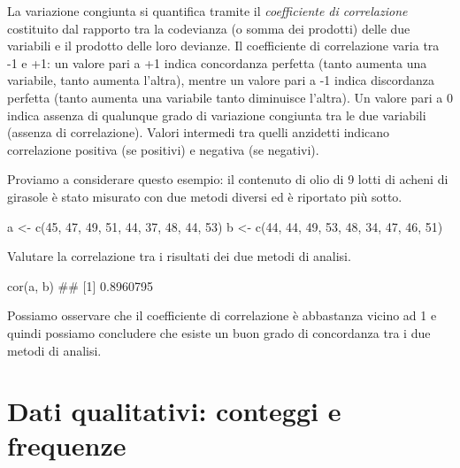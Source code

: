 \documentclass[a4paper,12pt,oneside]{book}
\newenvironment{Shaded}{}{}
\newcommand{\KeywordTok}[1]{#1}
\newcommand{\DecValTok}[1]{#1}
\newcommand{\StringTok}[1]{#1}
\newcommand{\CommentTok}[1]{#1}
\newcommand{\NormalTok}[1]{#1}
\begin{document}
La variazione congiunta si quantifica tramite il \emph{coefficiente di correlazione} costituito dal rapporto tra la codevianza (o somma dei prodotti) delle due variabili e il prodotto delle loro devianze. Il coefficiente di correlazione varia tra -1 e +1: un valore pari a +1 indica concordanza perfetta (tanto aumenta una variabile, tanto aumenta l'altra), mentre un valore pari a -1 indica discordanza perfetta (tanto aumenta una variabile tanto diminuisce l'altra). Un valore pari a 0 indica assenza di qualunque grado di variazione congiunta tra le due variabili (assenza di correlazione). Valori intermedi tra quelli anzidetti indicano correlazione positiva (se positivi) e negativa (se negativi).

Proviamo a considerare questo esempio: il contenuto di olio di 9 lotti di acheni di girasole è stato misurato con due metodi diversi ed è riportato più sotto.

\begin{Shaded}
\begin{Highlighting}[]
\NormalTok{a <-}\StringTok{ }\KeywordTok{c}\NormalTok{(}\DecValTok{45}\NormalTok{, }\DecValTok{47}\NormalTok{, }\DecValTok{49}\NormalTok{, }\DecValTok{51}\NormalTok{, }\DecValTok{44}\NormalTok{, }\DecValTok{37}\NormalTok{, }\DecValTok{48}\NormalTok{, }\DecValTok{44}\NormalTok{, }\DecValTok{53}\NormalTok{)}
\NormalTok{b <-}\StringTok{ }\KeywordTok{c}\NormalTok{(}\DecValTok{44}\NormalTok{, }\DecValTok{44}\NormalTok{, }\DecValTok{49}\NormalTok{, }\DecValTok{53}\NormalTok{, }\DecValTok{48}\NormalTok{, }\DecValTok{34}\NormalTok{, }\DecValTok{47}\NormalTok{, }\DecValTok{46}\NormalTok{, }\DecValTok{51}\NormalTok{)}
\end{Highlighting}
\end{Shaded}

Valutare la correlazione tra i risultati dei due metodi di analisi.

\begin{Shaded}
\begin{Highlighting}[]
\KeywordTok{cor}\NormalTok{(a, b)}
\CommentTok{## [1] 0.8960795}
\end{Highlighting}
\end{Shaded}

Possiamo osservare che il coefficiente di correlazione è abbastanza vicino ad 1 e quindi possiamo concludere che esiste un buon grado di concordanza tra i due metodi di analisi.

\hypertarget{dati-qualitativi-conteggi-e-frequenze}{%
\section*{Dati qualitativi: conteggi e frequenze}\label{dati-qualitativi-conteggi-e-frequenze}}
\end{document}
